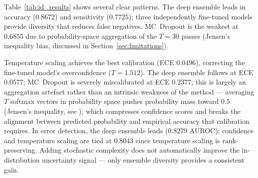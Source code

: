 \begin{table}[H]
    \centering
    \caption{In-distribution test results for the implemented uncertainty methods. Lower values are better for ECE, NLL, and AURC.}
    \label{tab:id_results}
\end{table}


Table~\ref{tab:id_results} shows several clear patterns. The deep ensemble leads in accuracy ($0.8672$) and sensitivity ($0.7725$); three independently fine-tuned models provide diversity that reduces false negatives. MC~Dropout is the weakest at $0.6855$ due to probability-space aggregation of the $T=30$ passes (Jensen's inequality bias, discussed in Section~\ref{sec:limitations}).

Temperature scaling achieves the best calibration (ECE $0.0496$), correcting the fine-tuned model's overconfidence ($T = 1.512$). The deep ensemble follows at ECE $0.0577$; MC~Dropout is severely miscalibrated at ECE $0.2377$; this is largely an aggregation artefact rather than an intrinsic weakness of the method --- averaging $T$ softmax vectors in probability space pushes probability mass toward $0.5$ (Jensen's inequality, see ), which compresses confidence scores and breaks the alignment between predicted probability and empirical accuracy that calibration requires. In error detection, the deep ensemble leads ($0.8279$ AUROC); confidence and temperature scaling are tied at $0.8043$ since temperature scaling is rank-preserving. Adding stochastic complexity does not automatically improve the in-distribution uncertainty signal --- only ensemble diversity provides a consistent gain.

